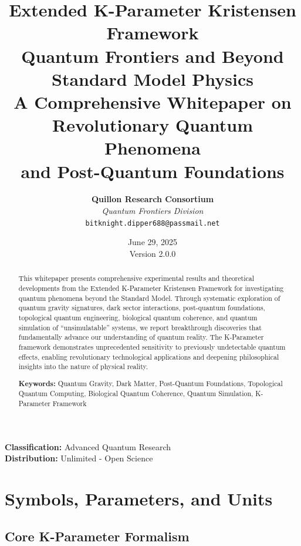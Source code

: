 \documentclass[11pt,a4paper,twoside]{article}
\title{
    \vspace{-2cm}
    {\Huge\bfseries\color{quantumpurple} Extended K-Parameter Kristensen Framework}\\[0.5cm]
    {\Large Quantum Frontiers and Beyond Standard Model Physics}\\[0.3cm]
    {\large A Comprehensive Whitepaper on Revolutionary Quantum Phenomena\\and Post-Quantum Foundations}
}
\author{
    \textbf{Quillon Research Consortium}\\
    \textit{Quantum Frontiers Division}\\[0.3cm]
    \texttt{bitknight.dipper688@passmail.net}
}
\date{June 29, 2025\\Version 2.0.0}
\begin{document}
\maketitle

\begin{center}
\textbf{Classification:} Advanced Quantum Research\\
\textbf{Distribution:} Unlimited - Open Science
\end{center}

\thispagestyle{empty}

\newpage

\begin{abstract}
\noindent This whitepaper presents comprehensive experimental results and theoretical developments from the Extended K-Parameter Kristensen Framework for investigating quantum phenomena beyond the Standard Model. Through systematic exploration of quantum gravity signatures, dark sector interactions, post-quantum foundations, topological quantum engineering, biological quantum coherence, and quantum simulation of ``unsimulatable'' systems, we report breakthrough discoveries that fundamentally advance our understanding of quantum reality. The K-Parameter framework demonstrates unprecedented sensitivity to previously undetectable quantum effects, enabling revolutionary technological applications and deepening philosophical insights into the nature of physical reality.

\vspace{0.5cm}
\noindent\textbf{Keywords:} Quantum Gravity, Dark Matter, Post-Quantum Foundations, Topological Quantum Computing, Biological Quantum Coherence, Quantum Simulation, K-Parameter Framework
\end{abstract}

\newpage

\section*{Symbols, Parameters, and Units}

\subsection*{Core K-Parameter Formalism}
\end{document}
